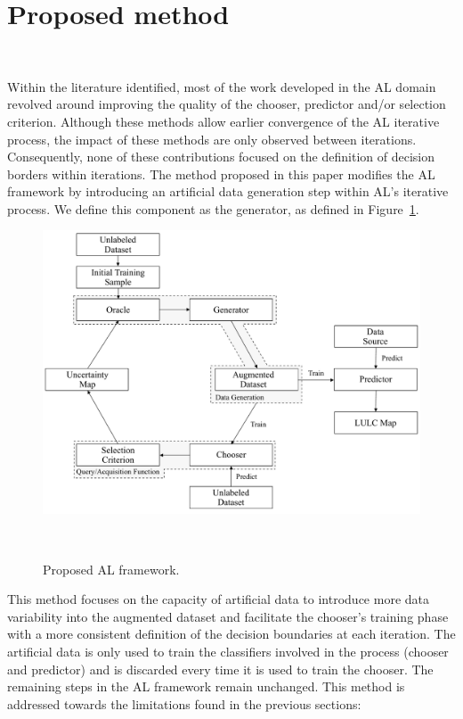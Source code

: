 \documentclass[parskip=full]{scrartcl}
\begin{document}
\section{Proposed method}~\label{sec:proposed-method}

Within the literature identified, most of the work developed in the AL domain revolved around
improving the quality of the chooser, predictor and/or selection criterion. Although these methods
allow earlier convergence of the AL iterative process, the impact of these methods are only observed
between iterations. Consequently, none of these contributions focused on the definition of decision
borders within iterations. The method proposed in this paper modifies the AL framework by
introducing an artificial data generation step within AL's iterative process. We define this
component as the generator, as defined in Figure~\ref{fig:al_new}. 

\begin{figure}[H]
	\centering
	\includegraphics[width=.85\linewidth]{../analysis/al_new}
	\caption{Proposed AL framework.
    }~\label{fig:al_new}
\end{figure}

This method focuses on the capacity of artificial data to introduce more data variability into the
augmented dataset and facilitate the chooser's training phase with a more consistent definition of
the decision boundaries at each iteration. The artificial data is only used to train the classifiers
involved in the process (chooser and predictor) and is discarded every time it is used to train the
chooser. The remaining steps in the AL framework remain unchanged. This method is addressed towards
the limitations found in the previous sections: 
\end{document}
